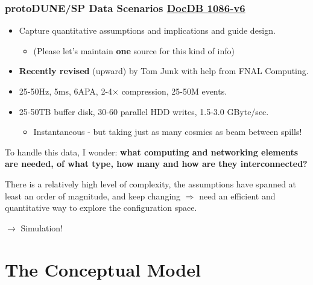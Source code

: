 \documentclass[xcolor=dvipsnames]{beamer}
\begin{document}
\begin{frame} 
  \frametitle{protoDUNE/SP Data Scenarios \href{http://docs.dunescience.org:8080/cgi-bin/ShowDocument?docid=1086}{DocDB 1086-v6}}
  
  \begin{itemize}\footnotesize
  \item Capture quantitative assumptions and implications and guide design.
    \begin{itemize}\scriptsize
    \item (Please let's maintain \textbf{one} source for this kind of info)
    \end{itemize}
  \item \textbf{Recently revised} (upward) by Tom Junk with help from FNAL Computing.
  \item 25-50Hz, 5ms, 6APA, 2-4$\times$ compression, 25-50M events.
  \item 25-50TB buffer disk, 30-60 parallel HDD writes, 1.5-3.0 GByte/sec.
    \begin{itemize}  \scriptsize
    \item Instantaneous - but taking just as many cosmics as beam between spills!
    \end{itemize}
  \end{itemize}

  \vfill

  \footnotesize

  To handle this data, I wonder: \textbf{what computing and networking
  elements are needed, of what type, how many and how are they
  interconnected?} 

  \vfill

  There is a relatively high level of complexity, the assumptions have
  spanned at least an order of magnitude, and keep changing
  $\Rightarrow$ need an efficient and quantitative way to explore the
  configuration space.

  \vfill
  $\rightarrow$ Simulation!
\end{frame}

\section{The Conceptual Model}

\begin{frame}
\end{frame}
\end{document}
